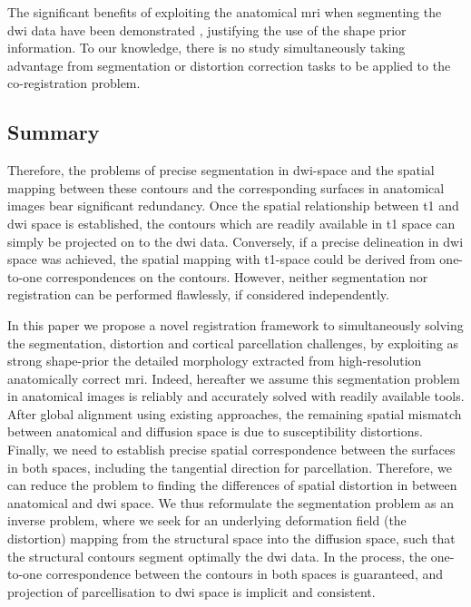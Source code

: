 The significant benefits of exploiting the anatomical \gls{mri} when 
segmenting the \gls{dwi} data have been demonstrated \cite{zollei_improved_2010}, 
justifying the use of the shape prior information. To our knowledge, there is
no study simultaneously taking advantage from segmentation or distortion correction
tasks to be applied to the co-registration problem.

\subsection{Summary}
\label{sec:contributions}
Therefore, the problems of precise segmentation in \gls{dwi}-space and the 
spatial mapping between these contours and the corresponding surfaces in 
anatomical images bear significant redundancy. Once the spatial relationship 
between \gls{t1} and \gls{dwi} space is established, the contours which are 
readily available in \gls{t1} space can simply be projected on to the 
\gls{dwi} data. Conversely, if a precise delineation in \gls{dwi} space 
was achieved, the spatial mapping with \gls{t1}-space could be derived 
from one-to-one correspondences on the contours. However, neither segmentation 
nor registration can be performed flawlessly, if considered independently. 


In this paper we propose a novel registration framework to simultaneously
solving the segmentation, distortion and cortical parcellation challenges, 
by exploiting as strong shape-prior the detailed morphology extracted 
from high-resolution anatomically correct \gls{mri}. Indeed, hereafter 
we assume this segmentation problem in anatomical images is reliably and
accurately solved with readily available tools. After global alignment 
using existing approaches, the remaining spatial mismatch between 
anatomical and diffusion space is due to susceptibility distortions.
Finally, we need to establish precise spatial correspondence between the 
surfaces in both spaces, including the tangential direction for parcellation.
Therefore, we can reduce the problem to finding the differences of spatial 
distortion in between anatomical and \gls{dwi} space.
We thus reformulate the segmentation problem as an inverse problem, where we 
seek for an underlying deformation field (the distortion) mapping 
from the structural space into the diffusion space, such that the structural 
contours segment optimally the \gls{dwi} data. In the process, the one-to-one 
correspondence between the contours in both spaces is guaranteed, and projection 
of parcellisation to \gls{dwi} space is implicit and consistent.

